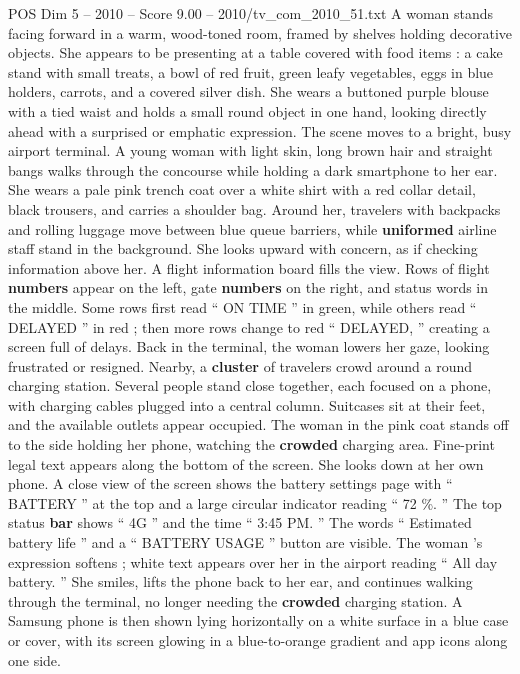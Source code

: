 \begin{textsample}{POS Dim 5 – 2010 – Score 9.00 – 2010/tv\_com\_2010\_51.txt}  \label{ex:f5_pos_046}
A woman stands facing forward in a warm, wood-toned room, framed by shelves holding decorative objects.
She appears to be presenting at a table covered with food items : a cake stand with small treats, a bowl of red fruit, green leafy vegetables, eggs in blue holders, carrots, and a covered silver dish.
She wears a buttoned purple blouse with a tied waist and holds a small round object in one hand, looking directly ahead with a surprised or emphatic expression.
The scene moves to a bright, busy airport terminal.
A young woman with light skin, long brown hair and straight bangs walks through the concourse while holding a dark smartphone to her ear.
She wears a pale pink trench coat over a white shirt with a red collar detail, black trousers, and carries a shoulder bag.
Around her, travelers with backpacks and rolling luggage move between blue queue barriers, while \textbf{uniformed} airline staff stand in the background.
She looks upward with concern, as if checking information above her.
A flight information board fills the view.
Rows of flight \textbf{numbers} appear on the left, gate \textbf{numbers} on the right, and status words in the middle.
Some rows first read “ ON TIME ” in green, while others read “ DELAYED ” in red ; then more rows change to red “ DELAYED, ” creating a screen full of delays.
Back in the terminal, the woman lowers her gaze, looking frustrated or resigned.
Nearby, a \textbf{cluster} of travelers crowd around a round charging station.
Several people stand close together, each focused on a phone, with charging cables plugged into a central column.
Suitcases sit at their feet, and the available outlets appear occupied.
The woman in the pink coat stands off to the side holding her phone, watching the \textbf{crowded} charging area.
Fine-print legal text appears along the bottom of the screen.
She looks down at her own phone.
A close view of the screen shows the battery settings page with “ BATTERY ” at the top and a large circular indicator reading “ 72 \%. ” The top status \textbf{bar} shows “ 4G ” and the time “ 3:45 PM. ” The words “ Estimated battery life ” and a “ BATTERY USAGE ” button are visible.
The woman ’s expression softens ; white text appears over her in the airport reading “ All day battery. ” She smiles, lifts the phone back to her ear, and continues walking through the terminal, no longer needing the \textbf{crowded} charging station.
A Samsung phone is then shown lying horizontally on a white surface in a blue case or cover, with its screen glowing in a blue-to-orange gradient and app icons along one side.

\end{textsample}
